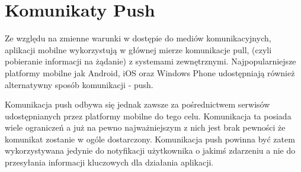 \section{Komunikaty Push}
\label{sec:push}
Ze względu na zmienne warunki w dostępie do mediów komunikacyjnych, aplikacji mobilne wykorzystują w głównej mierze komunikacje pull, (czyli pobieranie informacji na żądanie) z systemami zewnętrznymi. Najpopularniejsze platformy mobilne jak Android, iOS oraz Windows Phone udostępniają również alternatywny sposób komunikacji - push. 

Komunikacja push odbywa się jednak zawsze za pośrednictwem serwisów udostępnianych przez platformy mobilne do tego celu. Komunikacja ta posiada wiele ograniczeń a już na pewno najważniejszym z nich jest brak pewności że komunikat zostanie w ogóle dostarczony. Komunikacja push powinna być zatem wykorzystywana jedynie do notyfikacji użytkownika o jakimś zdarzeniu a nie do przesyłania informacji kluczowych dla działania aplikacji. 